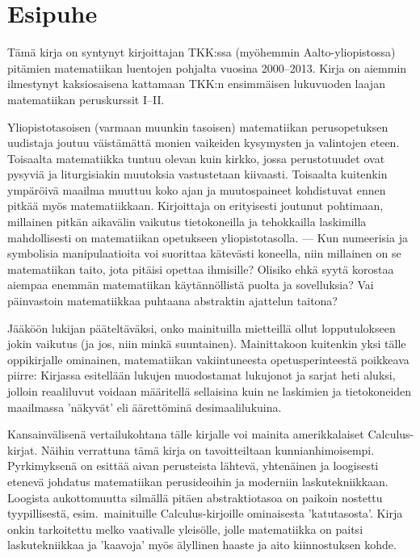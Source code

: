 \chapter*{Esipuhe}

Tämä kirja on syntynyt kirjoittajan TKK:ssa (myöhemmin Aalto-yliopistossa) pitämien matematiikan
luentojen pohjalta vuosina 2000--2013. Kirja on aiemmin ilmestynyt kaksiosaisena kattamaan
TKK:n ensimmäisen lukuvuoden laajan matematiikan peruskurssit I--II.

Yliopistotasoisen (varmaan muunkin tasoisen) matematiikan perusopetuksen uudistaja joutuu 
väistämättä monien vaikeiden kysymysten ja valintojen eteen. Toisaalta matematiikka tuntuu 
olevan kuin kirkko, jossa perustotuudet ovat pysyviä ja liturgisiakin muutoksia vastustetaan
kiivaasti. Toisaalta kuitenkin ympäröivä maailma muuttuu koko ajan ja muutospaineet
kohdistuvat ennen pitkää myös matematiikkaan. Kirjoittaja on erityisesti joutunut pohtimaan,
millainen pitkän aikavälin vaikutus tietokoneilla ja tehokkailla laskimilla mahdollisesti on
matematiikan opetukseen yliopistotasolla. --- Kun numeerisia ja symbolisia manipulaatioita
voi suorittaa kätevästi koneella, niin millainen on se matematiikan taito, jota pitäisi
opettaa ihmisille? Olisiko ehkä syytä korostaa aiempaa enemmän matematiikan käytännöllistä
puolta ja sovelluksia? Vai päinvastoin matematiikkaa puhtaana abstraktin ajattelun taitona? 

Jääköön lukijan pääteltäväksi, onko mainituilla mietteillä ollut lopputulokseen jokin 
vaikutus (ja jos, niin minkä suuntainen). Mainittakoon kuitenkin yksi tälle oppikirjalle 
ominainen, matematiikan vakiintuneesta opetusperinteestä poikkeava piirre: Kirjassa
esitellään lukujen muodostamat lukujonot ja sarjat heti aluksi, jolloin reaaliluvut voidaan
määritellä sellaisina kuin ne laskimien ja tietokoneiden maailmassa 'näkyvät' eli äärettöminä
desimaalilukuina.

Kansainvälisenä vertailukohtana tälle kirjalle voi mainita amerikkalaiset Calculus-kirjat. 
Näihin verrattuna tämä kirja on tavoitteiltaan kunnianhimoisempi. Pyrkimyksenä on esittää
aivan perusteista lähtevä, yhtenäinen ja loogisesti etenevä johdatus matematiikan
perusideoihin ja moderniin laskutekniikkaan. Loogista aukottomuutta silmällä pitäen
abstraktiotasoa on paikoin nostettu tyypillisestä, esim.\ mainituille Calculus-kirjoille
ominaisesta 'katutasosta'. Kirja onkin tarkoitettu melko vaativalle yleisölle, jolle
matematiikka on paitsi laskutekniikkaa ja 'kaavoja' myös älyllinen haaste ja aito
kiinnostuksen kohde. 

